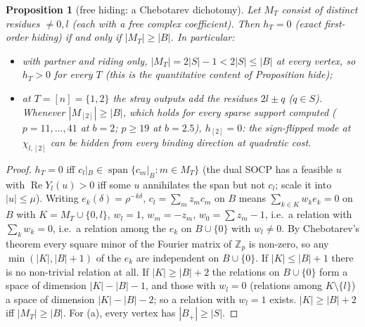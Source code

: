 \documentclass[11pt]{article}
\newtheorem{proposition}[theorem]{Proposition}
\theoremstyle{definition}
\renewcommand{\Re}{\operatorname{Re}}
\begin{document}
\begin{proposition}[free hiding: a Chebotarev dichotomy]\label{prop:dich}
Let $M_T$ consist of distinct residues $\ne0,l$ (each with a free complex coefficient).  Then $h_T=0$ (exact first-order hiding) if and only if
$|M_T|\ge|B|$.  In particular:
\begin{itemize}
\item[(a)] with partner and riding only, $|M_T|=2|S|-1<2|S|\le|B|$ at every vertex, so $h_T>0$ for every $T$ (this is the quantitative content of
Proposition \emph{hide});
\item[(b)] at $T=[n]=\{1,2\}$ the stray outputs add the residues $2l\pm q$ ($q\in S$).  Whenever $|M_{[2]}|\ge|B|$, which holds for every sparse
support computed ($p=11,\dots,41$ at $b=2$; $p\ge19$ at $b=2.5$), $h_{[2]}=0$: the sign-flipped mode at $\chi_{l,[2]}$ can be hidden from every binding
direction at quadratic cost.
\end{itemize}
\end{proposition}
\begin{proof}
$h_T=0$ iff $c_l|_B\in\operatorname{span}\{c_m|_B:m\in M_T\}$ (the dual SOCP has a feasible $u$ with $\Re Y_l(u)>0$ iff some $u$ annihilates the span but not
$c_l$; scale it into $|u|\le\mu$).  Writing $e_k(\delta)=\rho^{-k\delta}$, $c_l=\sum_mz_mc_m$ on $B$ means $\sum_{k\in K}w_ke_k=0$ on $B$ with
$K=M_T\cup\{0,l\}$, $w_l=1$, $w_m=-z_m$, $w_0=\sum z_m-1$, i.e.\ a relation with $\sum_kw_k=0$, i.e.\ a relation among the $e_k$ on $B\cup\{0\}$ with
$w_l\neq0$.  By Chebotarev's theorem every square minor of the Fourier matrix of $\mathbb Z_p$ is non-zero, so any $\min(|K|,|B|+1)$ of the $e_k$ are
independent on $B\cup\{0\}$.  If $|K|\le|B|+1$ there is no non-trivial relation at all.  If $|K|\ge|B|+2$ the relations on $B\cup\{0\}$ form a space of dimension
$|K|-|B|-1$, and those with $w_l=0$ (relations among $K\setminus\{l\}$) a space of dimension $|K|-|B|-2$; so a relation with $w_l=1$ exists.  $|K|\ge|B|+2$ iff
$|M_T|\ge|B|$.  For (a), every vertex has $|B_+|\ge|S|$.
\end{proof}
\end{document}
